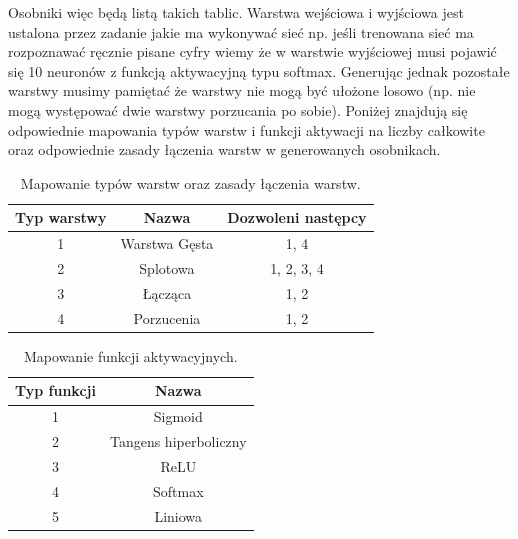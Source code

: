 \documentclass{article}
\begin{document}
Osobniki więc będą listą takich tablic.
Warstwa wejściowa i wyjściowa jest ustalona 
przez zadanie jakie ma wykonywać sieć np. jeśli trenowana sieć ma rozpoznawać ręcznie pisane
cyfry wiemy że w warstwie  wyjściowej musi pojawić się 10 neuronów z funkcją aktywacyjną
typu softmax.
Generując jednak pozostałe warstwy musimy pamiętać że warstwy nie mogą być ułożone losowo
(np. nie mogą występować dwie warstwy porzucania po sobie). Poniżej znajdują się odpowiednie
mapowania typów warstw i funkcji aktywacji na liczby całkowite oraz odpowiednie zasady 
łączenia warstw w generowanych osobnikach.\\

\begin{table}[!h]
\centering
\begin{tabular}{|c|c|c|}
	\hline
	Typ warstwy & Nazwa & Dozwoleni następcy \\
	\hline
	1 & Warstwa Gęsta & 1, 4\\
	2 & Splotowa & 1, 2, 3, 4\\
	3 & Łącząca & 1, 2\\
	4 & Porzucenia & 1, 2 \\
	\hline
\end{tabular}
\caption{\label{tab:rules}Mapowanie typów warstw oraz zasady łączenia warstw.}
\end{table}
\begin{table}[!h]
\centering
\begin{tabular}{|c|c|}
	\hline
	Typ funkcji & Nazwa\\
	\hline
	1 & Sigmoid \\
	2 & Tangens hiperboliczny \\
	3 & ReLU \\
	4 & Softmax \\
	5 & Liniowa \\
	\hline
\end{tabular}
\caption{\label{tab:fun}Mapowanie funkcji aktywacyjnych.}
\end{table}
\end{document}
